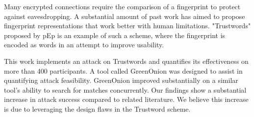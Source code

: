 Many encrypted connections require the comparison of a fingerprint to protect against eavesdropping. A substantial amount of past work has aimed to propose fingerprint representations that work better with human limitations. "Trustwords" proposed by pEp is an example of such a scheme, where the fingerprint is encoded as words in an attempt to improve usability.

This work implements an attack on Trustwords and quantifies its effectiveness on more than 400 participants.  A tool called GreenOnion was designed to assist in quantifying attack feasibility. GreenOnion improved substantially on a similar tool's ability to search for matches concurrently. Our findings show a substantial increase in attack success compared to related literature. We believe this increase is due to leveraging the design flaws in the Trustword scheme.